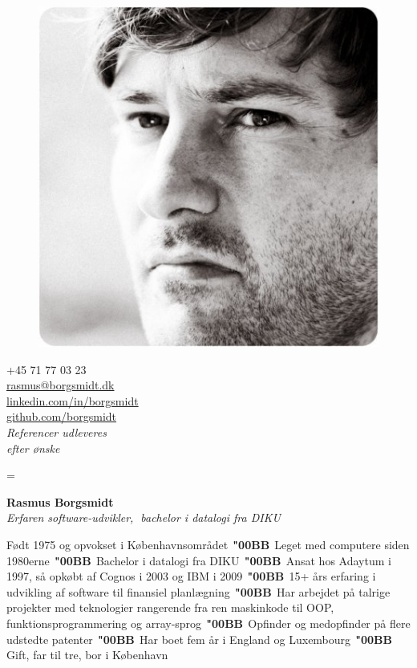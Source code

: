 \documentclass[a4paper,10pt,final]{memoir}
\newcommand{\Sep}{\vspace{1.5em}}
\newcommand{\Dot}{\mbox{\color{SpotColor}$\,\;$\textbf{\char"00BB}$\,\;$}}
\newenvironment{inlinepar}[1]
	{\ignorespaces{\lowsmallcapsspacing{\textbf{#1}}}}
	{\ignorespacesafterend}
\begin{document}
\begin{figure}
	\hfill
	\includegraphics[width=0.6\columnwidth]{../media/borgsmidt.jpg}
	\vspace{-7cm}
\end{figure}

\begin{flushright}\footnotesize
  +45 71 77 03 23\\
  \href{mailto:rasmus@borgsmidt.dk}{rasmus@borgsmidt.dk}\\
  \href{http://dk.linkedin.com/in/borgsmidt}{linkedin.com/in/borgsmidt}\\
  \href{https://github.com/borgsmidt}{github.com/borgsmidt}\\[12pt]
  {\em Referencer udleveres\\ efter ønske}
\end{flushright}\normalsize
\framebreak

\font%
\font%
\font=\font%

\huge{\textbf{Rasmus Borgsmidt}} \\
\Large{\color{SpotColor}\em Erfaren software-udvikler,$\;$ bachelor i datalogi fra DIKU}

\normalsize\normalfont

\Sep\begin{inlinepar}{kort om mig}
  Født 1975 og opvokset i Københavnsområdet\Dot Leget med computere siden
  1980\-erne\Dot Bachelor i datalogi fra DIKU\Dot Ansat hos Adaytum i 1997, så
  opkøbt af \mbox{Cognos} i 2003 og IBM i 2009\Dot 15+ års erfaring i udvikling
  af software til finansiel planlægning\Dot Har arbejdet på talrige projekter
  med tekno\-logier rangerende fra ren maskinkode til OOP,
  funktionsprogrammering og array-sprog\Dot Opfinder og medopfinder på flere
  udstedte patenter\Dot Har boet fem år i England og Luxembourg\Dot Gift, far
  til tre, bor i København
\end{inlinepar}
\end{document}
